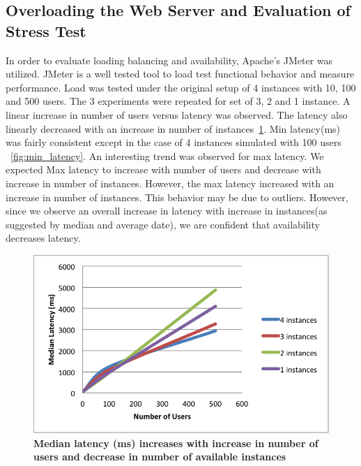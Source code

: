 \documentclass[12pt]{article}
\begin{document}
\subsection{Overloading the Web Server and Evaluation of Stress Test} In order to 
evaluate loading balancing and availability, Apache's JMeter was utilized. JMeter 
is a well tested tool to load test functional behavior and measure 
performance\cite{apache}. Load was tested under the original setup of 4 instances 
with 10, 100 and 500 users. The 3
experiments were repeated for set of 3, 2 and 1 instance. A linear increase in
number of users versus latency was observed. The latency also linearly decreased
with an increase in number of instances~\ref{fig:median_latency}. Min
latency(ms) was fairly consistent except in the case of 4 instances simulated
with 100 users ~\ref{fig:min_latency}. An interesting trend was observed for max
latency. We expected Max latency to increase with number of users and decrease
with increase in number of instances. However, the max latency increased with an
increase in number of instances. This behavior may be due to outliers. However,
since we observe an overall increase in latency with increase in instances(as
suggested by median and average date), we are confident that availability
decreases latency.  

\begin{figure}[H] 
\centering
\includegraphics[scale=0.75]{Images/median_latency.PNG} 
\caption{\textbf{Median
latency (ms) increases with increase in number of users and decrease in number
of available instances} } 
\label{fig:median_latency} 
\end{figure}
\end{document}
